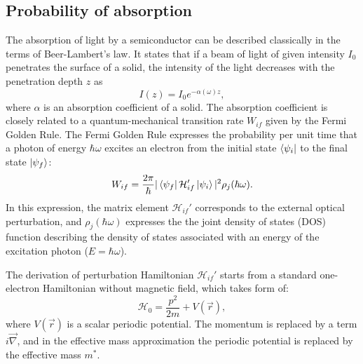 \documentclass[titlepage,a4paper]{book}
\newcommand{\wciecie}{\quad\phantom{v}}
\begin{document}
\subsection{Probability of absorption}
\label{section:oscillator_strength}
\wciecie
The absorption of light by a semiconductor can be described classically in the terms of Beer-Lambert's law. It states that if a beam of light of given intensity $I_0$ penetrates the surface of a solid, the intensity of the light decreases with the penetration depth $z$ as
\begin{equation}
\label{eq:L-B_law}
I(z) = I_0 e^{-\alpha (\omega) z},
\end{equation}
where $\alpha$ is an absorption coefficient of a solid. The absorption coefficient is closely related to a quantum-mechanical transition rate $W_{if}$ given by the Fermi Golden Rule. The Fermi Golden Rule expresses the probability per unit time that a photon of energy $\hbar\omega$ excites an electron from the initial state $\bra{\psi_i}$ to the final state $\ket{\psi_f}$:
\begin{equation}
W_{if} = \frac{2\pi}{\hbar} |\bra{\psi_f}\mathcal{H}_{if}'\ket{\psi_i}|^2 \rho_j(\hbar\omega).
\label{eq:FermiGolderRule}
\end{equation}
In this expression, the matrix element $\mathcal{H}_{if}'$ corresponds to the external optical perturbation, and $\rho_j(\hbar\omega)$ expresses the the joint density of states (DOS) function describing the density of states associated with an energy of the excitation photon ($E = \hbar \omega$). 

The derivation of perturbation Hamiltonian $\mathcal{H}_{if}'$ starts from a standard one-electron Hamiltonian without magnetic field, which takes form of:
\begin{equation}
\label{eq:Perturbed_Hamiltonian}
\mathcal{H}_0 = \frac{p^2}{2m} + V(\vec{r}),
\end{equation}  
where $V(\vec{r})$ is a scalar periodic potential. The momentum is replaced by a term $i\vec{\nabla}$, and in the effective mass approximation the periodic potential is replaced by the effective mass $m^*$. 
\end{document}
